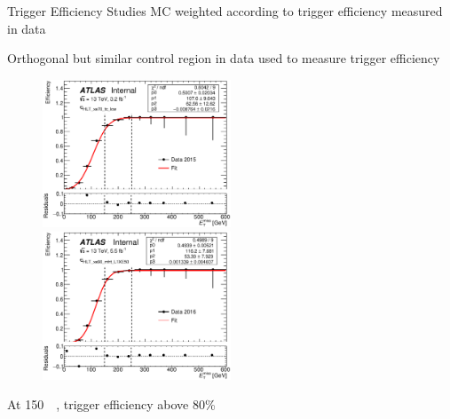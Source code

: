 \documentclass[10pt]{beamer}
\begin{document}
\begin{frame}{Trigger Efficiency Studies}
\centering
{\large\color{blue}MC weighted according to trigger efficiency measured in data}
\begin{outline}
\1 Orthogonal but similar control region in data used to measure trigger efficiency
\end{outline}
\begin{figure}
   \includegraphics[width=0.5\textwidth]{figures/xe70_tclcw_data15_fitted.eps}
   \includegraphics[width=0.5\textwidth]{figures/xe90_mht_data16_fitted.eps}
\end{figure}
\centering
{\large At 150~\GeV\ \met, trigger efficiency above 80\%}
\end{frame}
\end{document}
